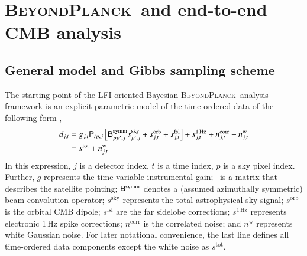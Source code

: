 \documentclass[twocolumn]{aa}
\newcommand{\B}[0]{\tens{B}}
\renewcommand{\P}[0]{\tens{P}}
\newcommand{\BP}{\textsc{BeyondPlanck}}
\begin{document}
\section{\BP\ and end-to-end CMB analysis}
\label{sec:bp}

\subsection{General model and Gibbs sampling scheme}

The starting point of the LFI-oriented Bayesian \BP\ analysis framework is an
explicit parametric model of the time-ordered data of the following
form \citep{bp01},
\begin{align}
    d_{j,t} &= g_{j,t} \P_{tp,j}\left[\B^{\mathrm{symm}}_{pp',j} s^{\mathrm{sky}}_{p',j}  + s^{\mathrm{orb}}_{j,t}  
      + s^{\mathrm{fsl}}_{j,t}\right] 
    + s^{\mathrm{1\,Hz}}_{j,t} + n^{\mathrm{corr}}_{j,t} +
    n^{\mathrm{w}}_{j,t}\\
    &\equiv s^{\mathrm{tot}} + n^{\mathrm{w}}_{j,t}
  \label{eq:todmodel}
\end{align}
In this expression, $j$ is a detector index, $t$ is a time index, $p$
is a sky pixel index. Further, $g$ represents the time-variable
instrumental gain; \P\ is a matrix that describes the satellite
pointing; $\B^{\mathrm{symm}}$ denotes a (assumed azimuthally
symmetric) beam convolution operator; $s^{\mathrm{sky}}$ represents
the total astrophysical sky signal; $s^{\mathrm{orb}}$ is the orbital
CMB dipole; $s^{\mathrm{fsl}}$ are the far sidelobe corrections;
$s^{\mathrm{1\,Hz}}$ represents electronic 1\,Hz spike corrections;
$n^{\mathrm{corr}}$ is the correlated noise; and $n^{\mathrm{w}}$
represents white Gaussian noise. For later notational convenience, the
last line defines all time-ordered data components except the white
noise as $s^{\mathrm{tot}}$.
\end{document}
